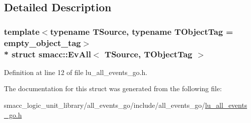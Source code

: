 \subsection{Detailed Description}
\subsubsection*{template$<$typename T\+Source, typename T\+Object\+Tag = empty\+\_\+object\+\_\+tag$>$\\*
struct smacc\+::\+Ev\+All$<$ T\+Source, T\+Object\+Tag $>$}



Definition at line 12 of file lu\+\_\+all\+\_\+events\+\_\+go.\+h.



The documentation for this struct was generated from the following file\+:\begin{DoxyCompactItemize}
\item 
smacc\+\_\+logic\+\_\+unit\+\_\+library/all\+\_\+events\+\_\+go/include/all\+\_\+events\+\_\+go/\hyperlink{lu__all__events__go_8h}{lu\+\_\+all\+\_\+events\+\_\+go.\+h}\end{DoxyCompactItemize}
